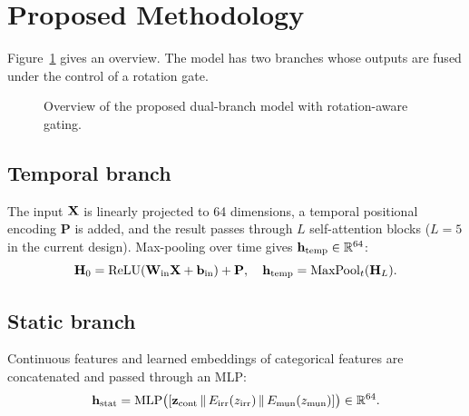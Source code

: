\section{Proposed Methodology}
\label{sec:method}

Figure~\ref{fig:arch} gives an overview. The model has two branches whose outputs are fused under the control of a rotation gate.

\begin{figure}[t]
\centering
\caption{Overview of the proposed dual-branch model with rotation-aware gating. }
\label{fig:arch}
\end{figure}

\subsection{Temporal branch}
The input $\mathbf{X}$ is linearly projected to 64 dimensions, a temporal positional encoding $\mathbf{P}$ is added, and the result passes through $L$ self-attention blocks ($L=5$ in the current design). Max-pooling over time gives $\mathbf{h}_{\mathrm{temp}}\in\mathbb{R}^{64}$:
\begin{equation}
\mathbf{H}_0=\mathrm{ReLU}(\mathbf{W}_{\mathrm{in}}\mathbf{X}+\mathbf{b}_{\mathrm{in}})+\mathbf{P},\quad
\mathbf{h}_{\mathrm{temp}}=\mathrm{MaxPool}_t(\mathbf{H}_L).
\end{equation}

\subsection{Static branch}
Continuous features and learned embeddings of categorical features are concatenated and passed through an MLP:
\begin{equation}
\mathbf{h}_{\mathrm{stat}}=\mathrm{MLP}\big([\mathbf{z}_{\mathrm{cont}}\,\|\,E_{\mathrm{irr}}(z_{\mathrm{irr}})\,\|\,E_{\mathrm{mun}}(z_{\mathrm{mun}})]\big)\in\mathbb{R}^{64}.
\end{equation}

